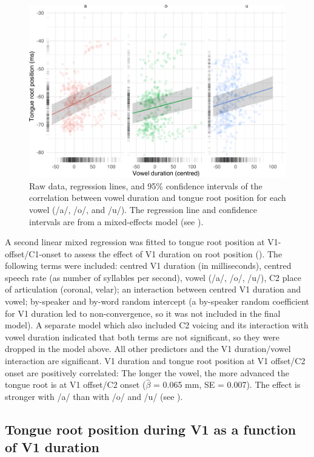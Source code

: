 \documentclass[preprint]{JASAnew}
\begin{document}
\label{s:trp-vdur}

\begin{figure}
\includegraphics[width=\linewidth]{./Figure5} \caption{Raw data, regression lines, and 95\% confidence intervals of the correlation between vowel duration and tongue root position for each vowel (/a/, /o/, and /u/). The regression line and confidence intervals are from a mixed-effects model (see ).}\label{f:Figure5}
\end{figure}

A second linear mixed regression was fitted to tongue root position at
V1-offset/C1-onset to assess the effect of V1 duration on root position
(). The following terms were included: centred
V1 duration (in milliseconds), centred speech rate (as number of
syllables per second), vowel (/a/, /o/, /u/), C2 place of articulation
(coronal, velar); an interaction between centred V1 duration and vowel;
by-speaker and by-word random intercept (a by-speaker random coefficient
for V1 duration led to non-convergence, so it was not included in the
final model). A separate model which also included C2 voicing and its
interaction with vowel duration indicated that both terms are not
significant, so they were dropped in the model above. All other
predictors and the V1 duration/vowel interaction are significant. V1
duration and tongue root position at V1 offset/C2 onset are positively
correlated: The longer the vowel, the more advanced the tongue root is
at V1 offset/C2 onset (\(\hat{\beta}\) = 0.065 mm, SE = 0.007). The
effect is stronger with /a/ than with /o/ and /u/ (see
).

\hypertarget{tongue-root-position-during-v1-as-a-function-of-v1-duration}{%
\subsection{Tongue root position during V1 as a function of V1
duration}\label{tongue-root-position-during-v1-as-a-function-of-v1-duration}}
\end{document}
